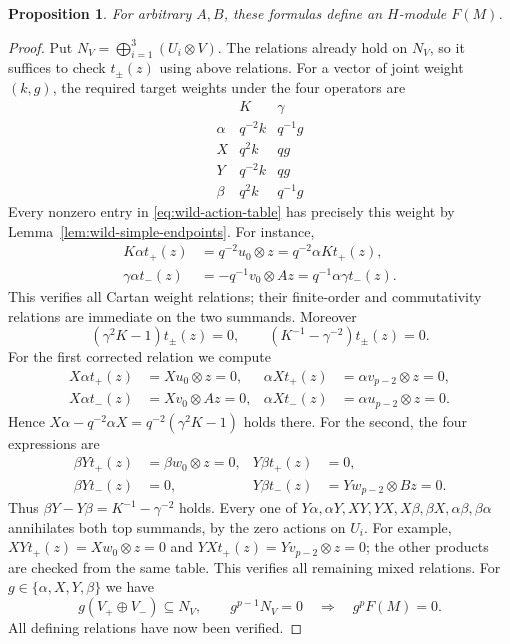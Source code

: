 \documentclass[10pt,oneside]{amsart}
\newtheorem{proposition}{Proposition}[section]
\theoremstyle{definition}
\begin{document}
\begin{proposition}\label{prop:wild-module-valid}
For arbitrary $A,B$, these formulas define an $H$-module $F(M)$.
\end{proposition}
\begin{proof}
Put $N_V=\bigoplus_{i=1}^3(U_i\otimes V)$. The relations already hold on $N_V$,
so it suffices to check $t_\pm(z)$ using
above relations.
For a vector of joint weight $(k,g)$, the required target weights
under the four operators are
\[
\begin{array}{c|cc}
 &K&\gamma\\\hline
 \alpha&q^{-2}k&q^{-1}g\\
 X&q^2k&qg\\
 Y&q^{-2}k&qg\\
 \beta&q^2k&q^{-1}g
\end{array}
\]
Every nonzero entry in \eqref{eq:wild-action-table} has precisely
this weight by Lemma~\ref{lem:wild-simple-endpoints}. For instance,
\begin{align*}
 K\alpha t_+(z)&=q^{-2}u_0\otimes z=q^{-2}\alpha Kt_+(z),\\
 \gamma\alpha t_-(z)&=-q^{-1}v_0\otimes Az
                       =q^{-1}\alpha\gamma t_-(z).
\end{align*}
This verifies all Cartan weight relations; their finite-order and
commutativity relations are immediate on the two summands.
Moreover
\[
 (\gamma^2K-1)t_\pm(z)=0,
 \qquad (K^{-1}-\gamma^{-2})t_\pm(z)=0.
\]
For the first corrected relation we compute
\begin{align*}
 X\alpha t_+(z)&=Xu_0\otimes z=0,&
 \alpha Xt_+(z)&=\alpha v_{p-2}\otimes z=0,\\
 X\alpha t_-(z)&=Xv_0\otimes Az=0,&
 \alpha Xt_-(z)&=\alpha u_{p-2}\otimes z=0.
\end{align*}
Hence $X\alpha-q^{-2}\alpha X=q^{-2}(\gamma^2K-1)$ holds there.
For the second, the four expressions are
\begin{align*}
 \beta Yt_+(z)&=\beta w_0\otimes z=0,&Y\beta t_+(z)&=0,\\
 \beta Yt_-(z)&=0,&Y\beta t_-(z)&=Yw_{p-2}\otimes Bz=0.
\end{align*}
Thus $\beta Y-Y\beta=K^{-1}-\gamma^{-2}$ holds.
Every one of $Y\alpha,\alpha Y,XY,YX,X\beta,\beta X,
\alpha\beta,\beta\alpha$ annihilates both top summands, by the
zero actions on $U_i$. For example,
$XYt_+(z)=Xw_0\otimes z=0$ and
$YXt_+(z)=Yv_{p-2}\otimes z=0$; the other products are checked
from the same table. This verifies all remaining mixed relations.
For $g\in\{\alpha,X,Y,\beta\}$ we have
\[
 g(V_+\oplus V_-)\subseteq N_V,\qquad
 g^{p-1}N_V=0\quad\Longrightarrow\quad g^pF(M)=0.
\]
All defining relations have now been verified.
\end{proof}
\end{document}
